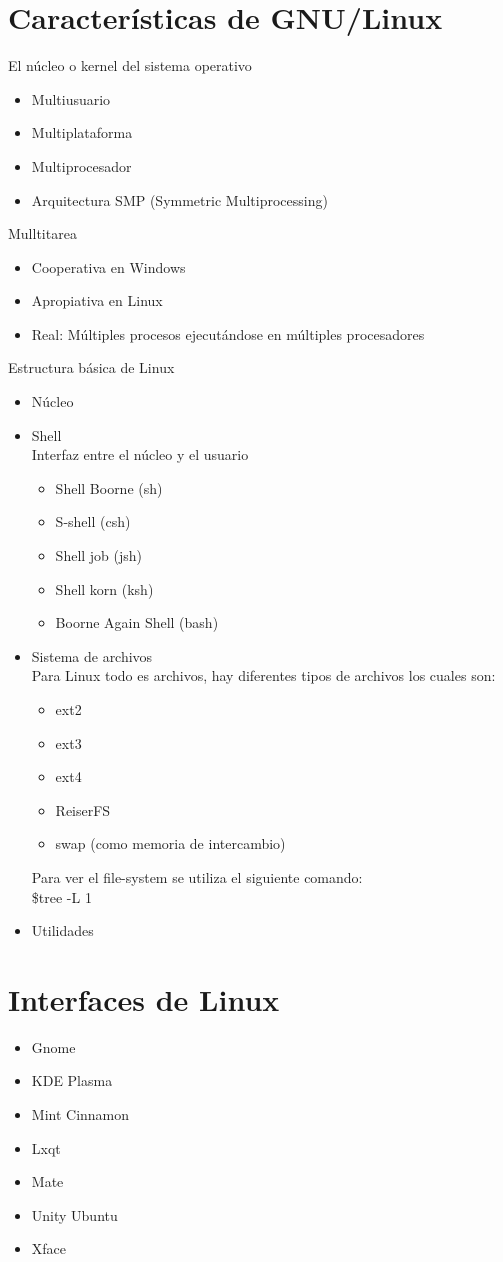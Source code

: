 \documentclass[12pt,a4paper]{report}
\begin{document}
\section{Caracter\'{i}sticas de GNU/Linux}
El n\'{u}cleo o kernel del sistema operativo
\begin{itemize}
\item Multiusuario
\item Multiplataforma
\item Multiprocesador
\item Arquitectura SMP (Symmetric Multiprocessing)
\end{itemize}
Mulltitarea
\begin{itemize}
\item Cooperativa en Windows
\item Apropiativa en Linux
\item Real: M\'{u}ltiples procesos ejecut\'{a}ndose en m\'{u}ltiples procesadores
\end{itemize}
Estructura b\'{a}sica de Linux
\begin{itemize}
\item N\'{u}cleo
\item Shell\\
Interfaz entre el n\'{u}cleo y el usuario
\begin{itemize}
\item Shell Boorne (sh)
\item S-shell (csh)
\item Shell job (jsh)
\item Shell korn (ksh)
\item Boorne Again Shell (bash)
\end{itemize}
\item Sistema de archivos\\
Para Linux todo es archivos, hay diferentes tipos de archivos los cuales son:
\begin{itemize}
\item ext2
\item ext3
\item ext4
\item ReiserFS
\item swap (como memoria de intercambio)
\end{itemize}
Para ver el file-system se utiliza el siguiente comando:\\
\$tree -L 1
\item Utilidades
\end{itemize}
\section{Interfaces de Linux}
\begin{itemize}
\item Gnome
\item KDE Plasma
\item Mint Cinnamon
\item Lxqt
\item Mate
\item Unity Ubuntu
\item Xface
\end{itemize}
\end{document}
